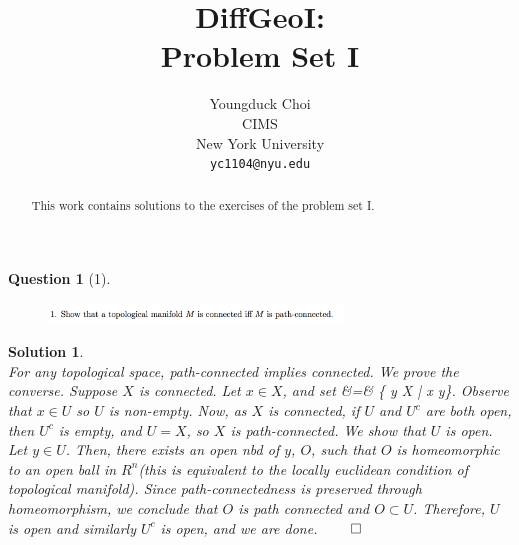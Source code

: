\documentclass{article} %
\title{DiffGeoI: \\
Problem Set I}
\author{
Youngduck Choi \\
CIMS \\
New York University\\
\texttt{yc1104@nyu.edu} \\
}
\def\eQb#1\eQe{\begin{eqnarray*}#1\end{eqnarray*}}
\theoremstyle{quest}
\newtheorem*{question}{Question}
\newtheorem*{solution}{Solution}
\begin{document}
\maketitle

\begin{abstract}
This work contains solutions to the exercises of the problem set I.
\end{abstract}

\bigskip

\begin{question}[1]
\hfill
\begin{figure}[h!]
  \centering
    \includegraphics[width=0.7\textwidth]{DG-e1-p1.png}
\end{figure}
\end{question}
\begin{solution} \hfill \\
For any topological space, path-connected implies connected. We prove the converse.
Suppose $X$ is connected. Let $x \in X$, and set
\eQb
U &=& \{ y \in X \>|\> \> x \>\> y\}.
\eQe
Observe that $x \in U$ so $U$ is non-empty. Now, as $X$ is connected,
if $U$ and $U^c$ are both open, then $U^c$ is empty, and $U = X$, so
$X$ is path-connected. We show that $U$ is open. Let $y \in U$. Then,
there exists an open nbd of $y$, $O$, such that $O$ is homeomorphic to 
an open ball in $R^n$(this is equivalent to the locally euclidean
condition of topological manifold). Since
path-connectedness is preserved through homeomorphism, we conclude that $O$
is path connected and $O \subset U$. Therefore, $U$ is open and similarly
$U^c$ is open, and we are done. \hfill $\qed$ 

\end{solution}

\newpage
\end{document}

